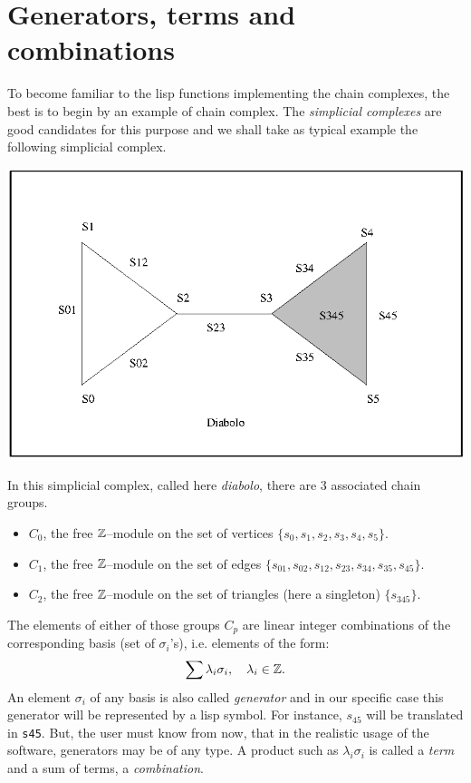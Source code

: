 \section {Generators, terms and combinations}

To become familiar to the lisp functions implementing the chain complexes, the best is to begin
by an example of chain complex. The {\em simplicial complexes} are good candidates
for this purpose and we shall take as typical example the following simplicial
complex.
%
\vskip 0.50cm
\centerline{\includegraphics{diabolo.eps}}
\vskip 0.50cm
%
In this simplicial complex, called here {\em diabolo}, there are $3$ associated chain groups.
\begin{itemize}
\item $C_0$, the free ${\Bbb Z}$--module on the set of vertices $\{s_0,s_1,s_2,s_3,s_4,s_5 \}$.
\item $C_1$, the free ${\Bbb Z}$--module on the set of  edges 
   $\{ s_{01}, s_{02}, s_{12}, s_{23}, s_{34}, s_{35}, s_{45} \}$.
\item $C_2$, the free ${\Bbb Z}$--module on the set of  triangles (here a singleton)
   $\{ s_{345} \}$.
\end{itemize}
The elements of either of those groups $C_p$ are linear integer combinations  of the
corresponding basis (set of $\sigma_i$'s), i.e. elements of the form:
$$ \sum {\lambda_i \sigma_i}, \quad \lambda_i \in {\Bbb Z}. $$
An element $\sigma_i$ of any basis is also called {\em generator} and in our specific case
this generator will be represented by a  lisp symbol. For instance,
$s_{45}$ will be translated in {\tt s45}. But, the user must know from now, that in the realistic
usage of the software, generators may be of any type.
A product such as $\lambda_i \sigma_i$ is called
a {\em term} and a sum of terms, a {\em combination}.

